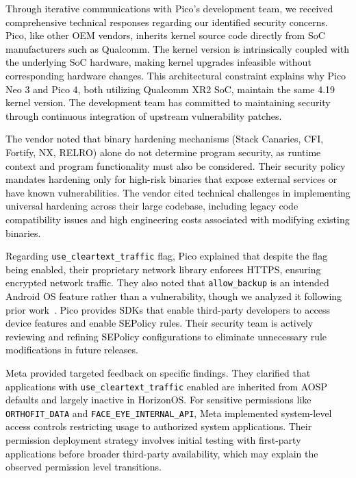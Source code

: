 \documentclass[sigconf]{acmart}
\newcommand{\bheading}[1]{{\vspace{2pt}\noindent{\textbf{#1}}}}
\newcommand{\cc}[1]{\mbox{\smaller[0.5]\texttt{#1}}}
\newcounter{note}[section]
\newcommand{\rev}[1]{\textcolor{black}{#1}}
\begin{document}
\bheading{Pico's response.}
\rev{Through iterative communications with Pico's development team, we received comprehensive technical responses regarding our identified security concerns.}
\rev{Pico, like other OEM vendors, inherits kernel source code directly from SoC manufacturers such as Qualcomm. The kernel version is intrinsically coupled with the underlying SoC hardware, making kernel upgrades infeasible without corresponding hardware changes. This architectural constraint explains why Pico Neo 3 and Pico 4, both utilizing Qualcomm XR2 SoC, maintain the same 4.19 kernel version. The development team has committed to maintaining security through continuous integration of upstream vulnerability patches.}

\rev{
The vendor noted that binary hardening mechanisms (Stack Canaries, CFI, Fortify, NX, RELRO) alone do not determine program security, as runtime context and program functionality must also be considered. Their security policy mandates hardening only for high-risk binaries that expose external services or have known vulnerabilities. The vendor cited technical challenges in implementing universal hardening across their large codebase, including legacy code compatibility issues and high engineering costs associated with modifying existing binaries.}

\rev{
Regarding \cc{use\_cleartext\_traffic} flag, Pico explained that despite the flag being enabled, their proprietary network library enforces HTTPS, ensuring encrypted network traffic. 
They also noted that \cc{allow\_backup} is an intended Android OS feature rather than a vulnerability, though we analyzed it following prior work~\cite{guo2024empirical}.
}
\rev{Pico provides SDKs that enable third-party developers to access device features and enable SEPolicy rules. Their security team is actively reviewing and refining SEPolicy configurations to eliminate unnecessary rule modifications in future releases.
}

\bheading{Meta's response.}
\rev{
Meta provided targeted feedback on specific findings. They clarified that applications with \cc{use\_cleartext\_traffic} enabled are inherited from AOSP defaults and largely inactive in HorizonOS. For sensitive permissions like \cc{ORTHOFIT\_DATA} and \cc{FACE\_EYE\_INTERNAL\_API}, Meta implemented system-level access controls restricting usage to authorized system applications. Their permission deployment strategy involves initial testing with first-party applications before broader third-party availability, which may explain the observed permission level transitions.
}
\end{document}
